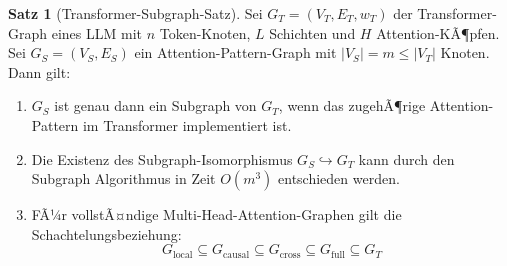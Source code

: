 ﻿\documentclass[a4paper,12pt]{article}
\theoremstyle{definition}
\newtheorem{satz}{Satz}
\begin{document}
\begin{satz}[Transformer-Subgraph-Satz]
\label{satz:transformer_subgraph}
	Sei $G_T = (V_T, E_T, w_T)$ der Transformer-Graph eines LLM mit $n$ Token-Knoten,
	$L$ Schichten und $H$ Attention-KÃ¶pfen. Sei $G_S = (V_S, E_S)$ ein
	Attention-Pattern-Graph mit $|V_S| = m \leq |V_T|$ Knoten. Dann gilt:

	\begin{enumerate}
		\item $G_S$ ist genau dann ein Subgraph von $G_T$, wenn das zugehÃ¶rige
		      Attention-Pattern im Transformer implementiert ist.
		\item Die Existenz des Subgraph-Isomorphismus $G_S \hookrightarrow G_T$
		      kann durch den Subgraph Algorithmus in Zeit $O(m^3)$ entschieden werden.
		\item FÃ¼r vollstÃ¤ndige Multi-Head-Attention-Graphen gilt die
		      Schachtelungsbeziehung:
		      \[
		      G_{\mathrm{local}} \subseteq G_{\mathrm{causal}} \subseteq G_{\mathrm{cross}} \subseteq G_{\mathrm{full}} \subseteq G_T
		      \]
	\end{enumerate}
\end{satz}
\end{document}
